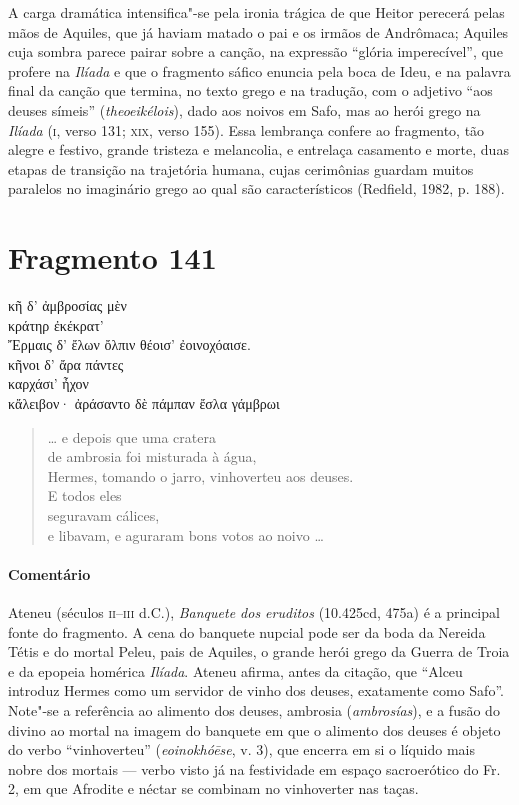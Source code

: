 {{A carga dramática intensifica"-se pela ironia trágica de que Heitor perecerá
pelas mãos de Aquiles, que já haviam matado o pai e os irmãos de Andrômaca; Aquiles cuja sombra parece pairar sobre a canção, na expressão ``glória imperecível'', que profere na \textit{Ilíada} e que o fragmento sáfico enuncia pela boca de Ideu, e na palavra final da canção que termina, no texto grego e na tradução, com o adjetivo ``aos deuses símeis'' (\textit{theoeikélois}), dado aos noivos em Safo, mas ao herói grego na \textit{Ilíada} (\textsc{i}, verso 131; \textsc{xix}, verso 155).
Essa lembrança confere ao fragmento, tão alegre e festivo, grande tristeza e
melancolia, e entrelaça casamento e morte, duas etapas de transição na trajetória
humana, cujas cerimônias guardam muitos paralelos no imaginário grego ao qual são característicos (Redfield, 1982, p. 188).}



\pagebreak
\section{Fragmento 141}

\begin{gkverse}
κῆ δ’ ἀμβροσίας μὲν\\
κράτηρ ἐκέκρατ’\\
Ἔρμαις δ’ ἔλων ὄλπιν θέοισ’ ἐοινοχόαισε.\\
κῆνοι δ’ ἄρα πάντες\\
καρχάσι’ ἦχον\\
κἄλειβον· ἀράσαντο δὲ πάμπαν ἔσλα γάμβρωι
\end{gkverse}

\begin{verse}
\ldots{} e depois que uma cratera\\
de ambrosia foi misturada à água,\\
Hermes, tomando o jarro, vinhoverteu aos deuses.\\
E todos eles\\
seguravam cálices,\\
e libavam, e aguraram bons votos ao noivo \ldots{}
\end{verse}

\paragraph{Comentário}
Ateneu (séculos \textsc{ii--iii} d.C.), \textit{Banquete dos eruditos} (10.425cd, 475a) é a principal fonte do fragmento. A cena  do  banquete nupcial pode ser da boda da Nereida Tétis e do mortal Peleu, pais de Aquiles, o grande herói grego da Guerra de Troia e da epopeia homérica \textit{Ilíada}. Ateneu afirma, antes da citação, que “Alceu introduz Hermes como um servidor de vinho dos deuses, exatamente como Safo”. Note"-se a referência ao alimento dos deuses, ambrosia (\textit{ambrosías}), e a fusão do divino ao mortal na imagem do banquete em que o alimento dos deuses é objeto do verbo ``vinhoverteu'' (\textit{eoinokhóēse}, v. 3), que encerra em si o líquido mais nobre dos mortais --- verbo visto já na festividade em espaço sacroerótico do Fr. 2, em que Afrodite e néctar se combinam no vinhoverter nas taças.


}
